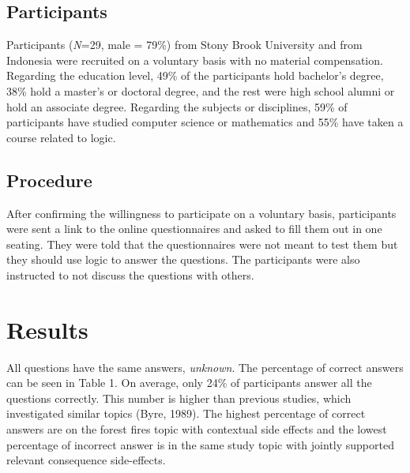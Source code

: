 \documentclass[]{interact}
\theoremstyle{plain}%
\theoremstyle{definition}
\theoremstyle{remark}
\begin{document}
\subsection{Participants}

Participants (\textit{N}=29, male = 79\%) from Stony Brook University and from Indonesia were recruited on a voluntary basis with no material compensation. Regarding the education level, 49\% of the participants hold bachelor’s degree, 38\% hold a master's or doctoral degree, and the rest were high school alumni or hold an associate degree. Regarding the subjects or disciplines, 59\% of participants have studied computer science or mathematics and 55\% have taken a course related to logic.

\subsection{Procedure}

After confirming the willingness to participate on a voluntary basis, participants were sent a link to the online questionnaires and asked to fill them out in one seating. They were told that the questionnaires were not meant to test them but they should use logic to answer the questions. The participants were also instructed to not discuss the questions with others. 

\section{Results}

All questions have the same answers, \textit{unknown}. The percentage of correct answers can be seen in Table 1. On average, only 24\% of participants answer all the questions correctly. This number is higher than previous studies, which investigated similar topics (Byre, 1989). The highest percentage of correct answers are on the forest fires topic with contextual side effects and the lowest percentage of incorrect answer is in the same study topic with jointly supported relevant consequence side-effects.
\end{document}
